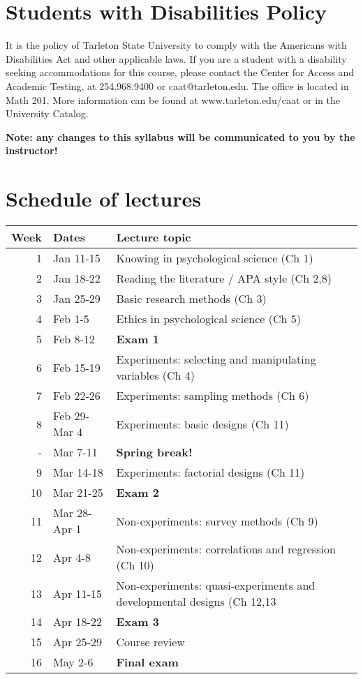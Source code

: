 \documentclass[10pt]{article}
\begin{document}
\section*{Students with Disabilities Policy}
\label{sec-9}

It is the policy of Tarleton State University to comply with the Americans with Disabilities Act and other applicable laws. If you are a student with a disability seeking accommodations for this course, please contact the Center for Access and Academic Testing, at 254.968.9400 or caat@tarleton.edu. The office is located in Math 201. More information can be found at www.tarleton.edu/caat or in the University Catalog.



\textbf{\textbf{Note:  any changes to this syllabus will be communicated to you by the instructor!}}

\section*{Schedule of lectures}
\label{sec-10}

\begin{center}
\begin{tabular}{rll}
Week & Dates & Lecture topic\\
\hline
1 & Jan 11-15 & Knowing in psychological science (Ch 1)\\
2 & Jan 18-22 & Reading the literature / APA style (Ch 2,8)\\
3 & Jan 25-29 & Basic research methods (Ch 3)\\
4 & Feb 1-5 & Ethics in psychological science (Ch 5)\\
5 & Feb 8-12 & \textbf{Exam 1}\\
6 & Feb 15-19 & Experiments: selecting and manipulating variables (Ch 4)\\
7 & Feb 22-26 & Experiments: sampling methods (Ch 6)\\
8 & Feb 29-Mar 4 & Experiments: basic designs (Ch 11)\\
- & Mar 7-11 & \textbf{Spring break!}\\
9 & Mar 14-18 & Experiments: factorial designs (Ch 11)\\
10 & Mar 21-25 & \textbf{Exam 2}\\
11 & Mar 28-Apr 1 & Non-experiments: survey methods (Ch 9)\\
12 & Apr 4-8 & Non-experiments: correlations and regression (Ch 10)\\
13 & Apr 11-15 & Non-experiments: quasi-experiments and developmental designs (Ch 12,13\\
14 & Apr 18-22 & \textbf{Exam 3}\\
15 & Apr 25-29 & Course review\\
16 & May 2-6 & \textbf{Final exam}\\
\end{tabular}
\end{center}
\end{document}
